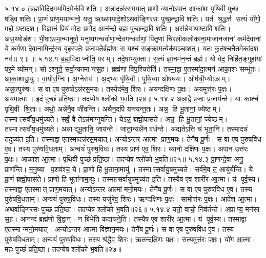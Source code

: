 ५.१४.०
(ब्र॒ह्म॒विदिदमयमिदमेक॑विशतिः। अन्ना॒दन्न॑रस॒मयात् प्राणो॒ व्यानोऽपान आका॑शः॒ पृथिवी पुच्छ॒ षड्विशतिः। प्रा॒णं प्रा॑ण॒मयान्मनो॒ यजु॒\ar{} ऋख्सामादे॒शोऽथर्वाङ्गिरसः पुच्छ॒न्द्वाविशतिः। यत॑ श्र॒द्धर्त्त सत्यं यो॑गो॒ महोऽष्टाद॑श। वि॒ज्ञानं॒ प्रियं॒ मोदः प्रमोद आन॑न्दो॒ ब्रह्म पुच्छ॒न्द्वाविशतिः। अस॑न्ने॒वाथाष्टाविशतिः। अस॒थ्षोड॑श। भी॒षाऽस्मा॒न्मानुषो॒ मनुष्यगन्धर्वाणा॒न्देवगन्धर्वाणां॒ पितृणां चिरलोकलोकाना॒माजानजानां कर्मदेवानां ये कर्मणा देवाना॒मिन्द्र॑स्य॒ बृहस्पतेः॒ प्रजापते॒र्ब्रह्म॑णः॒ स यश्च॑ सङ्क्रा॒मत्येक॑पञ्चा॒शत्। यतः॒ कुत॑श्च॒नैतमेका॑दश॒ नव॑॥ ९॥ ॥
५.१४.१
ब्र॒ह्म॒विदाप्नोति॒ परम्। तदे॒षाभ्यु॑क्ता। स॒त्यं ज्ञा॒नम॑न॒न्तं ब्रह्म॑। यो वेद॒ निहि॑त॒ङ्गुहा॑यां पर॒मे व्यो॑मन्। सोऽश्नुते॒ सर्वा॒न्कामान्त्स॒ह। ब्रह्म॑णा विप॒श्चितेति॑। तस्मा॒द्वा ए॒तस्मा॑दा॒त्मन॑ आका॒शः सम्भू॑तः। आ॒का॒शाद्वा॒युः। वा॒योर॒ग्निः। अ॒ग्नेराप॑। अ॒द्भ्यः पृ॑थि॒वी। पृ॒थि॒व्या ओष॑धयः। ओष॑धी॒भ्योऽन्नम्। अन्ना॒त्पुरु॑षः। स वा एष पुरुषोऽन्न॑रस॒मयः। तस्येद॑मेव॒ शिरः। अयन्दक्षि॑णः प॒क्षः। अयमुत्त॑रः प॒क्षः। अयमात्मा। इदं पुच्छं॑ प्रति॒ष्ठा। तदप्येष श्लो॑को भ॒वति॥२४॥
५.१४.२
अन्ना॒द्वै प्र॒जाः प्र॒जाय॑न्ते। याः काश्च॑ पृथि॒वी श्रि॒ताः। अथो॒ अन्ने॑नै॒व जी॑वन्ति। अथै॑न॒दपि॑ यन्त्यन्त॒तः। अन्न॒ हि भू॒तानां॒ ज्येष्ठम्। तस्मात्सर्वौष॒धमु॑च्यते। सर्वं॒ वै तेऽन्न॑माप्नुवन्ति। येऽन्नं॒ ब्रह्मो॒पास॑ते। अन्न॒ हि भू॒तानां॒ ज्येष्ठम्। तस्मात्सर्वौष॒धमु॑च्यते। अन्नाद्भू॒तानि॒ जाय॑न्ते। जाता॒न्यन्ने॑न वर्धन्ते। अद्यतेऽत्ति च॑ भूता॒नि। तस्मादन्नं तदुच्य॑त इ॒ति। तस्माद्वा एतस्मादन्न॑रस॒मयात्। अन्योऽन्तर आत्मा प्राण॒मयः। तेनै॑ष पू॒र्णः। स वा एष पुरुषवि॑ध ए॒व। तस्य पुरु॑षवि॒धताम्। अन्वयं॑ पुरुष॒विधः। तस्य प्राण॑ एव॒ शिरः। व्यानो दक्षि॑णः प॒क्षः। अपान उत्त॑रः प॒क्षः। आका॑श आ॒त्मा। पृथिवी पुच्छं॑ प्रति॒ष्ठा। तदप्येष श्लो॑को भ॒वति॥२५॥
५.१४.३
प्रा॒णन्दे॒वा अनु॒ प्राण॑न्ति। म॒नु॒ष्या प॒शव॑श्च॒ ये। प्रा॒णो हि भू॒ताना॒मायु॑। तस्मात्सर्वायु॒षमु॑च्यते। सर्व॑मे॒व त॒ आयु॑र्\mbox{}यन्ति। ये प्रा॒णं ब्रह्मो॒पास॑ते। प्राणो हि भूता॑नामा॒युः। तस्मात्सर्वायुषमुच्य॑त इ॒ति। तस्यैष एव शारी॑र आ॒त्मा। य॑ पूर्व॒स्य। तस्माद्वा एतस्मात् प्राण॒मयात्। अन्योऽन्तर आत्मा॑ मनो॒मयः। तेनै॑ष पू॒र्णः। स वा एष पुरुषवि॑ध ए॒व। तस्य पुरु॑षवि॒धताम्। अन्वयं॑ पुरुष॒विधः। तस्य यजु॑रेव॒ शिरः। ऋग्दक्षि॑णः प॒क्षः। सामोत्त॑रः प॒क्षः। आदे॑श आ॒त्मा। अथर्वाङ्गिरसः पुच्छं॑ प्रति॒ष्ठा। तदप्येष श्लो॑को भ॒वति॥२६॥
५.१४.४
यतो॒ वाचो॒ निव॑र्तन्ते। अप्राप्य॒ मन॑सा स॒ह। आनन्दं ब्रह्म॑णो वि॒द्वान्। न बिभेति कदा॑चने॒ति। तस्यैष एव शारी॑र आ॒त्मा। य॑ पूर्व॒स्य। तस्माद्वा एतस्मान्मनो॒मयात्। अन्योऽन्तर आत्मा वि॑ज्ञान॒मयः। तेनै॑ष पू॒र्णः। स वा एष पुरुषवि॑ध ए॒व। तस्य पुरु॑षवि॒धताम्। अन्वयं॑ पुरुष॒विधः। तस्य श्र॑द्धैव॒ शिरः। ऋतन्दक्षि॑णः प॒क्षः। सत्यमुत्त॑रः प॒क्षः। यो॑ग आ॒त्मा। महः पुच्छं॑ प्रति॒ष्ठा। तदप्येष श्लो॑को भ॒वति॥२७॥
